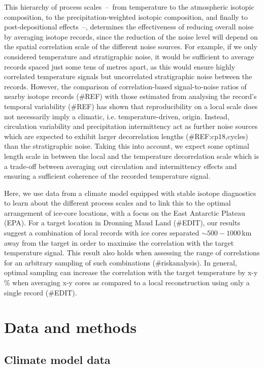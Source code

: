 \documentclass[cp, manuscript]{copernicus}
\begin{document}
This hierarchy of process scales~--~from temperature to the atmospheric isotopic
composition, to the precipitation-weighted isotopic composition, and finally to
post-depositional effects~--, determines the effectiveness of reducing overall
noise by averaging isotope records, since the reduction of the noise level will
depend on the spatial correlation scale of the different noise sources. For
example, if we only considered temperature and stratigraphic noise, it would be
sufficient to average records spaced just some tens of metres apart, as this
would ensure highly correlated temperature signals but uncorrelated
stratigraphic noise between the records. However, the comparison of
correlation-based signal-to-noise ratios of nearby isotope records (\#REF) with
those estimated from analysing the record's temporal variability (\#REF) has
shown that reproducibility on a local scale does not necessarily imply a
climatic, i.e. temperature-driven, origin. Instead, circulation variability and
precipitation intermittency act as further noise sources which are expected to
exhibit larger decorrelation lengths (\#REF:cp18,cycles) than the stratigraphic
noise. Taking this into account, we expect some optimal length scale in between
the local and the temperature decorrelation scale which is a trade-off between
averaging out circulation and intermittency effects and ensuring a sufficient
coherence of the recorded temperature signal.

Here, we use data from a climate model equipped with stable isotope diagnostics
to learn about the different process scales and to link this to the optimal
arrangement of ice-core locations, with a focus on the East Antarctic Plateau
(EPA). For a target location in Dronning Maud Land (\#EDIT), our results suggest
a combination of local records with ice cores separated $\sim500-1000$\,km away
from the target in order to maximise the correlation with the target temperature
signal. This result also holds when assessing the range of correlations for an
arbitrary sampling of such combinations (\#riskanalysis). In general, optimal
sampling can increase the correlation with the target temperature by x-y\,\%
when averaging x-y cores as compared to a local reconstruction using only a
single record (\#EDIT).

\section{Data and methods}\label{methods}

\subsection{Climate model data}\label{methods:data}
\end{document}
